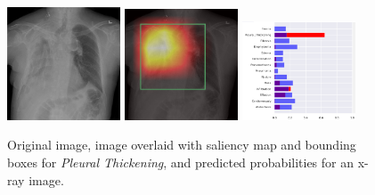 \documentclass[8pt]{beamer}
\begin{document}
\begin{frame}
\begin{figure}[H]
  \centering
  \includegraphics[width=0.3\textwidth]{images/preds/PT}\hspace{0.01\textwidth}%
  \includegraphics[width=0.3\textwidth]{images/preds/PT_cam}\hspace{0.01\textwidth}%
  \includegraphics[width=0.3\textwidth]{images/preds/PT_probs}\\[0.01\textwidth]
  \caption{Original image, image overlaid with saliency map and bounding boxes
    for \emph{Pleural Thickening}, and predicted probabilities for an x-ray
    image.}
  \label{examples_13}
\end{figure}
\end{frame}
\end{document}
